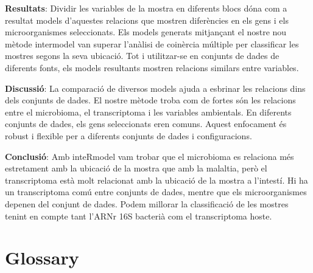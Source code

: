 \documentclass[
  12pt,
  a4paper,
  twoside,
  openright]{book}
\begin{document}
\textbf{Resultats}: Dividir les variables de la mostra en diferents blocs dóna com a resultat models d'aquestes relacions que mostren diferències en els gens i els microorganismes seleccionats.
Els models generats mitjançant el nostre nou mètode intermodel van superar l'anàlisi de coinèrcia múltiple per classificar les mostres segons la seva ubicació.
Tot i utilitzar-se en conjunts de dades de diferents fonts, els models resultants mostren relacions similars entre variables.

\textbf{Discussió}: La comparació de diversos models ajuda a esbrinar les relacions dins dels conjunts de dades.
El nostre mètode troba com de fortes són les relacions entre el microbioma, el transcriptoma i les variables ambientals.
En diferents conjunts de dades, els gens seleccionats eren comuns.
Aquest enfocament és robust i flexible per a diferents conjunts de dades i configuracions.

\textbf{Conclusió}: Amb inteRmodel vam trobar que el microbioma es relaciona més estretament amb la ubicació de la mostra que amb la malaltia, però el transcriptoma està molt relacionat amb la ubicació de la mostra a l'intestí.
Hi ha un transcriptoma comú entre conjunts de dades, mentre que els microorganismes depenen del conjunt de dades.
Podem millorar la classificació de les mostres tenint en compte tant l'ARNr 16S bacterià com el transcriptoma hoste.

\hypertarget{glossary}{%
\chapter*{Glossary}\label{glossary}}
\end{document}
